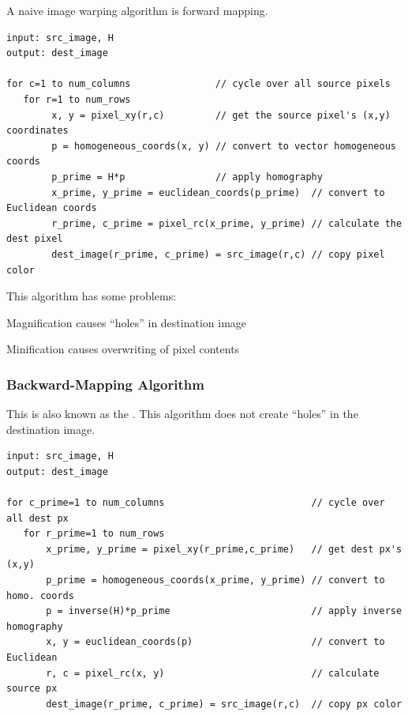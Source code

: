 \begin{example}
    A naive image warping algorithm is forward mapping. 

    \begin{verbatim}
input: src_image, H
output: dest_image

for c=1 to num_columns               // cycle over all source pixels
   for r=1 to num_rows
        x, y = pixel_xy(r,c)         // get the source pixel's (x,y) coordinates
        p = homogeneous_coords(x, y) // convert to vector homogeneous coords
        p_prime = H*p                // apply homography
        x_prime, y_prime = euclidean_coords(p_prime)  // convert to Euclidean coords
        r_prime, c_prime = pixel_rc(x_prime, y_prime) // calculate the dest pixel    
        dest_image(r_prime, c_prime) = src_image(r,c) // copy pixel color            
    \end{verbatim}

    This algorithm has some problems:

    \begin{listu}
        \item Magnification causes ``holes'' in destination image
        \item Minification causes overwriting of pixel contents
    \end{listu}
\end{example}

\subsubsection{Backward-Mapping Algorithm}

This is also known as the . This algorithm does not create ``holes'' in the destination image.

\begin{verbatim}
input: src_image, H
output: dest_image

for c_prime=1 to num_columns                          // cycle over all dest px
   for r_prime=1 to num_rows
       x_prime, y_prime = pixel_xy(r_prime,c_prime)   // get dest px's (x,y)
       p_prime = homogeneous_coords(x_prime, y_prime) // convert to homo. coords
       p = inverse(H)*p_prime                         // apply inverse homography
       x, y = euclidean_coords(p)                     // convert to Euclidean
       r, c = pixel_rc(x, y)                          // calculate source px
       dest_image(r_prime, c_prime) = src_image(r,c)  // copy px color
\end{verbatim}

